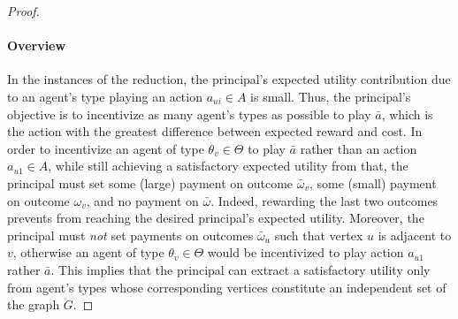 \begin{proof}
	\paragraph{Overview}
	In the instances of the reduction, the principal's expected utility contribution due to an agent's type playing an action $a_{u i} \in A$ is small.
	Thus, the principal's objective is to incentivize as many agent's types as possible to play $\bar a$, which is the action with the greatest difference between expected reward and cost.
	In order to incentivize an agent of type $\theta_v \in \Theta$ to play $\bar a$ rather than an action $a_{u 1} \in A$, while still achieving a satisfactory expected utility from that, the principal must set some (large) payment on outcome $\bar \omega_v$, some (small) payment on outcome $\omega_v$, and no payment on $\bar \omega$.
	Indeed, rewarding the last two outcomes prevents from reaching the desired principal's expected utility.
	Moreover, the principal must \emph{not} set payments on outcomes $\bar \omega_u$ such that vertex $u$ is adjacent to $v$, otherwise an agent of type $\theta_v \in \Theta$ would be incentivized to play action $a_{u 1}$ rather $\bar a$.
	This implies that the principal can extract a satisfactory utility only from agent's types whose corresponding vertices constitute an independent set of the graph $G$. 
	
	

\end{proof}
